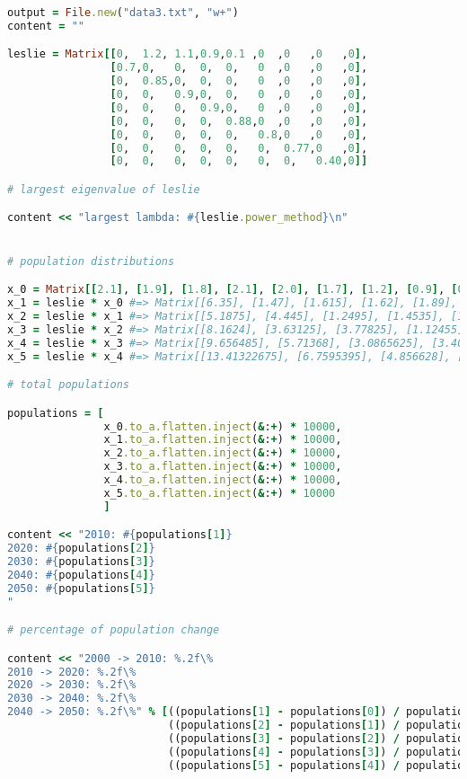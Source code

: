 \documentclass[letterpaper,12pt]{article}
\begin{document}
\lstset{caption=Populations}
\begin{lstlisting}[language=ruby]
output = File.new("data3.txt", "w+")
content = ""

leslie = Matrix[[0,  1.2, 1.1,0.9,0.1 ,0  ,0   ,0   ,0],
                [0.7,0,   0,  0,  0,   0  ,0   ,0   ,0],
                [0,  0.85,0,  0,  0,   0  ,0   ,0   ,0],
                [0,  0,   0.9,0,  0,   0  ,0   ,0   ,0],
                [0,  0,   0,  0.9,0,   0  ,0   ,0   ,0],
                [0,  0,   0,  0,  0.88,0  ,0   ,0   ,0],
                [0,  0,   0,  0,  0,   0.8,0   ,0   ,0],
                [0,  0,   0,  0,  0,   0,  0.77,0   ,0],
                [0,  0,   0,  0,  0,   0,  0,   0.40,0]]

# largest eigenvalue of leslie

content << "largest lambda: #{leslie.power_method}\n"


# population distributions

x_0 = Matrix[[2.1], [1.9], [1.8], [2.1], [2.0], [1.7], [1.2], [0.9], [0.5]]
x_1 = leslie * x_0 #=> Matrix[[6.35], [1.47], [1.615], [1.62], [1.89], [1.76], [1.36], [0.924], [0.36]]
x_2 = leslie * x_1 #=> Matrix[[5.1875], [4.445], [1.2495], [1.4535], [1.458], [1.6632], [1.408], [1.0472], [0.3696]]
x_3 = leslie * x_2 #=> Matrix[[8.1624], [3.63125], [3.77825], [1.12455], [1.30815], [1.28304], [1.33056], [1.08416], [0.41888]]
x_4 = leslie * x_3 #=> Matrix[[9.656485], [5.71368], [3.0865625], [3.400425], [1.012095], [1.151172], [1.026432], [1.0245312], [0.433664]]
x_5 = leslie * x_4 #=> Matrix[[13.41322675], [6.7595395], [4.856628], [2.77790625], [3.0603825], [0.8906436], [0.9209376], [0.79035264], [0.40981248]]

# total populations

populations = [
               x_0.to_a.flatten.inject(&:+) * 10000,
               x_1.to_a.flatten.inject(&:+) * 10000,
               x_2.to_a.flatten.inject(&:+) * 10000,
               x_3.to_a.flatten.inject(&:+) * 10000,
               x_4.to_a.flatten.inject(&:+) * 10000,
               x_5.to_a.flatten.inject(&:+) * 10000
			   ]

content << "2010: #{populations[1]}
2020: #{populations[2]}
2030: #{populations[3]}
2040: #{populations[4]}
2050: #{populations[5]}
"

# percentage of population change

content << "2000 -> 2010: %.2f\%
2010 -> 2020: %.2f\%
2020 -> 2030: %.2f\%
2030 -> 2040: %.2f\%
2040 -> 2050: %.2f\%" % [((populations[1] - populations[0]) / populations[0] * 100),
                         ((populations[2] - populations[1]) / populations[1] * 100),
                         ((populations[3] - populations[2]) / populations[2] * 100),
                         ((populations[4] - populations[3]) / populations[3] * 100),
                         ((populations[5] - populations[4]) / populations[4] * 100)]
\end{lstlisting}
\end{document}
